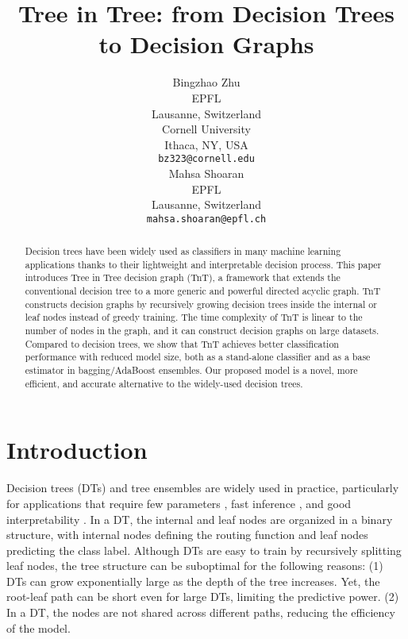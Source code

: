 \documentclass{article}
\title{Tree in Tree: from Decision Trees to Decision Graphs}
\author{%
  Bingzhao Zhu\\
  EPFL \\ Lausanne, Switzerland \\
  Cornell University \\ Ithaca, NY, USA \\
  \texttt{bz323@cornell.edu} \\
  \And
  Mahsa Shoaran \\
  EPFL \\
Lausanne, Switzerland \\
\texttt{mahsa.shoaran@epfl.ch} \\
}
\begin{document}
\maketitle

\begin{abstract}
Decision trees have been widely used as classifiers in many machine learning applications thanks to their lightweight and interpretable decision process. This paper introduces Tree in Tree decision graph (TnT), a framework that extends the conventional decision tree to a more generic and powerful directed acyclic graph. TnT constructs decision graphs by recursively growing decision trees inside the internal or leaf nodes instead of greedy training. The time complexity of TnT is linear to the number of nodes in the graph, and it can construct decision graphs on large datasets. Compared to decision trees, we show that TnT achieves better classification performance with reduced model size, both as a stand-alone classifier and as a base estimator in bagging/AdaBoost ensembles. Our proposed model is a novel, more efficient, and accurate alternative to the widely-used decision trees.

\end{abstract}

\section{Introduction}
Decision trees (DTs) and tree ensembles are widely used in practice, particularly for applications that require few parameters \cite{zharmagambetov2020smaller, kumar2017resource, zhu2020resot, shoaran2018energy, tanno2019adaptive}, fast inference \cite{carreira2018alternating, mathy2015boundary, zhu2021closed}, and good interpretability \cite{silva2020optimization, lundberg2017unified}. In a DT, the internal and leaf nodes are organized in a binary structure, with internal nodes defining the routing function and leaf nodes predicting the class label. Although DTs are easy to train by recursively splitting leaf nodes,  the tree structure can be suboptimal for the following reasons: (1) DTs can grow exponentially large as the depth of the tree increases. Yet, the root-leaf path can be short even for large DTs,  limiting the predictive power. 
(2) In a DT, the nodes are not shared across different paths, reducing the efficiency of the model.
\end{document}
